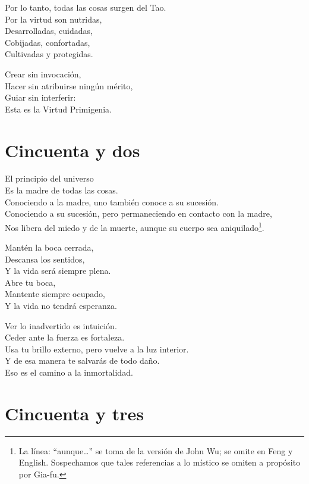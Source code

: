 \documentclass[hidelinks]{memoir}
\begin{document}
	Por lo tanto, todas las cosas surgen del Tao.\\
	Por la virtud son nutridas,\\
	Desarrolladas, cuidadas,\\
	Cobijadas, confortadas,\\
	Cultivadas y protegidas.
	
	Crear sin invocación,\\
	Hacer sin atribuirse ningún mérito,\\
	Guiar sin interferir:\\
	Esta es la Virtud Primigenia.
	
	\chapter*{Cincuenta y dos}
	
	El principio del universo\\
	Es la madre de todas las cosas.\\
	Conociendo a la madre, uno también conoce a su sucesión.\\
	Conociendo a su sucesión, pero permaneciendo en contacto con la madre,\\
	Nos libera del miedo y de la muerte, aunque su cuerpo sea aniquilado\footnote{La línea: ``aunque\ldots'' se toma de la versión de John Wu; se omite en
		Feng y English. Sospechamos que tales referencias a lo místico se omiten
		a propósito por Gia-fu.}.
	
	Mantén la boca cerrada,\\
	Descansa los sentidos,\\
	Y la vida será siempre plena.\\
	Abre tu boca,\\
	Mantente siempre ocupado,\\
	Y la vida no tendrá esperanza.
	
	Ver lo inadvertido es intuición.\\
	Ceder ante la fuerza es fortaleza.\\
	Usa tu brillo externo, pero vuelve a la luz interior.\\
	Y de esa manera te salvarás de todo daño.\\
	Eso es el camino a la inmortalidad.
	
	\chapter*{Cincuenta y tres}
	
\end{document}
